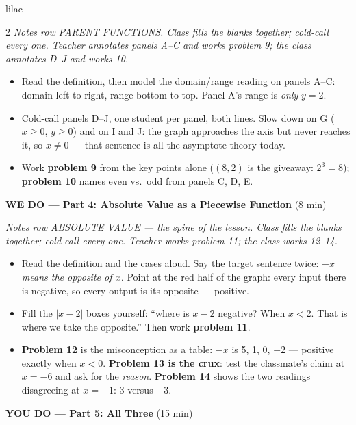 \documentclass[10pt]{article}
\begin{document}
\begin{skillbox}{lilac}
\begin{multicols}{2}
\textit{Notes row PARENT FUNCTIONS. Class fills the blanks together; cold-call every one.
Teacher annotates panels A--C and works problem 9; the class annotates D--J and works 10.}
\begin{itemize}
  \item Read the definition, then model the domain/range reading on panels A--C: domain left to
        right, range bottom to top. Panel A's range is \textit{only} $y = 2$.
  \item Cold-call panels D--J, one student per panel, both lines. Slow down on G ($x \ge 0$,
        $y \ge 0$) and on I and J: the graph approaches the axis but never reaches it, so
        $x \ne 0$ --- that sentence is all the asymptote theory today.
  \item Work \textbf{problem 9} from the key points alone ($(8, 2)$ is the giveaway: $2^3 = 8$);
        \textbf{problem 10} names even vs.\ odd from panels C, D, E.
\end{itemize}

\textbf{WE DO --- Part 4: Absolute Value as a Piecewise Function} (8 min)

\textit{Notes row ABSOLUTE VALUE --- the spine of the lesson. Class fills the blanks together;
cold-call every one. Teacher works problem 11; the class works 12--14.}
\begin{itemize}
  \item Read the definition and the cases aloud. Say the target sentence twice: \textit{$-x$
        means the opposite of $x$.} Point at the red half of the graph: every input there is
        negative, so every output is its opposite --- positive.
  \item Fill the $|x - 2|$ boxes yourself: ``where is $x - 2$ negative? When $x < 2$. That is
        where we take the opposite.'' Then work \textbf{problem 11}.
  \item \textbf{Problem 12} is the misconception as a table: $-x$ is 5, 1, 0, $-2$ --- positive
        exactly when $x < 0$. \textbf{Problem 13 is the crux}: test the classmate's claim at
        $x = -6$ and ask for the \textit{reason}. \textbf{Problem 14} shows the two readings
        disagreeing at $x = -1$: 3 versus $-3$.
\end{itemize}

\textbf{YOU DO --- Part 5: All Three} (15 min)


\end{multicols}
\end{skillbox}
\end{document}
